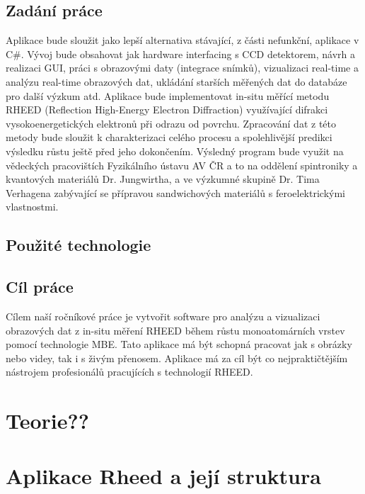 \documentclass[a4paper]{article}
\begin{document}
\subsection{Zadání práce}
    Aplikace bude sloužit jako lepší alternativa stávající, z části nefunkční, aplikace v C\#. Vývoj bude obsahovat jak hardware interfacing s CCD detektorem, návrh a realizaci GUI, práci s obrazovými daty (integrace snímků), vizualizaci real-time a analýzu real-time obrazových dat, ukládání starších měřených dat do databáze pro další výzkum atd. Aplikace bude implementovat in-situ měřící metodu RHEED (Reflection High-Energy Electron Diffraction) využívající difrakci vysokoenergetických elektronů při odrazu od povrchu. Zpracování dat z této metody bude sloužit k charakterizaci celého procesu a spolehlivější predikci výsledku růstu ještě před jeho dokončením. Výsledný program bude využit na vědeckých pracovištích Fyzikálního ústavu AV ČR a to na oddělení spintroniky a kvantových materiálů Dr. Jungwirtha, a ve výzkumné skupině Dr. Tima Verhagena zabývající se přípravou sandwichových materiálů s feroelektrickými vlastnostmi.
\subsection{Použité technologie}


\subsection{Cíl práce}
    Cílem naší ročníkové práce je vytvořit software pro analýzu a vizualizaci obrazových dat z in-situ  měření RHEED během růstu monoatomárních vrstev pomocí technologie MBE. Tato aplikace má být schopná pracovat jak s obrázky nebo videy, tak i s živým přenosem. Aplikace má za cíl být co nejpraktičtějším nástrojem profesionálů pracujících s technologií RHEED.

\section{Teorie??}

\section{Aplikace Rheed a její struktura}
    
\end{document}
